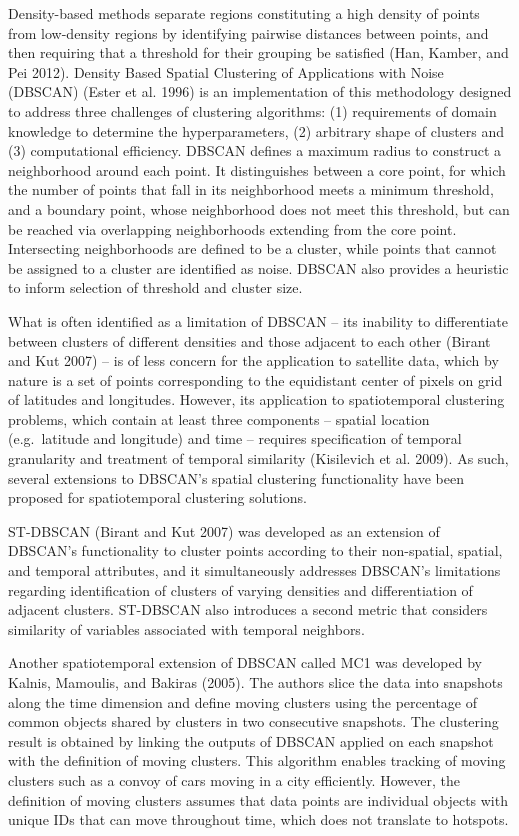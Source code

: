 Density-based methods separate regions constituting a high density of points from low-density regions by identifying pairwise distances between points, and then requiring that a threshold for their grouping be satisfied (Han, Kamber, and Pei 2012). Density Based Spatial Clustering of Applications with Noise (DBSCAN) (Ester et al. 1996) is an implementation of this methodology designed to address three challenges of clustering algorithms: (1) requirements of domain knowledge to determine the hyperparameters, (2) arbitrary shape of clusters and (3) computational efficiency. DBSCAN defines a maximum radius to construct a neighborhood around each point. It distinguishes between a core point, for which the number of points that fall in its neighborhood meets a minimum threshold, and a boundary point, whose neighborhood does not meet this threshold, but can be reached via overlapping neighborhoods extending from the core point. Intersecting neighborhoods are defined to be a cluster, while points that cannot be assigned to a cluster are identified as noise. DBSCAN also provides a heuristic to inform selection of threshold and cluster size.

What is often identified as a limitation of DBSCAN -- its inability to differentiate between clusters of different densities and those adjacent to each other (Birant and Kut 2007) -- is of less concern for the application to satellite data, which by nature is a set of points corresponding to the equidistant center of pixels on grid of latitudes and longitudes. However, its application to spatiotemporal clustering problems, which contain at least three components -- spatial location (e.g.~latitude and longitude) and time -- requires specification of temporal granularity and treatment of temporal similarity (Kisilevich et al. 2009). As such, several extensions to DBSCAN's spatial clustering functionality have been proposed for spatiotemporal clustering solutions.

ST-DBSCAN (Birant and Kut 2007) was developed as an extension of DBSCAN's functionality to cluster points according to their non-spatial, spatial, and temporal attributes, and it simultaneously addresses DBSCAN's limitations regarding identification of clusters of varying densities and differentiation of adjacent clusters. ST-DBSCAN also introduces a second metric that considers similarity of variables associated with temporal neighbors.

Another spatiotemporal extension of DBSCAN called MC1 was developed by Kalnis, Mamoulis, and Bakiras (2005). The authors slice the data into snapshots along the time dimension and define moving clusters using the percentage of common objects shared by clusters in two consecutive snapshots.
The clustering result is obtained by linking the outputs of DBSCAN applied on each snapshot with the definition of moving clusters. This algorithm enables tracking of moving clusters such as a convoy of cars moving in a city efficiently. However, the definition of moving clusters assumes that data points are individual objects with unique IDs that can move throughout time, which does not translate to hotspots.

